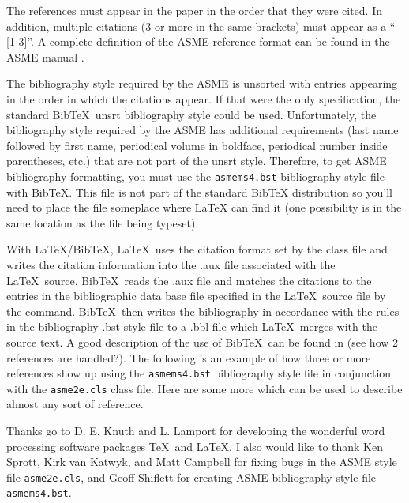 \documentclass[twocolumn,10pt]{asme2e}
\begin{document}
The references must appear in the paper in the order that
they were cited.  In addition, multiple citations (3 or
more in the same brackets) must appear as a `` [1-3]''.  A
complete definition of the ASME reference format can be
found in the  ASME manual \cite{asmemanual}.

The bibliography style required by the ASME is unsorted
with entries appearing in the order in which the citations
appear. If that were the only specification, the standard
{\sc Bib}\TeX\ unsrt bibliography style could be used.
Unfortunately, the bibliography style required by the ASME
has additional requirements (last name followed by first
name, periodical volume in boldface, periodical number
inside parentheses, etc.) that are not part of the unsrt
style. Therefore, to get ASME bibliography formatting, you
must use the \verb+asmems4.bst+ bibliography style file
with {\sc Bib}\TeX. This file is not part of the standard
BibTeX distribution so you'll need to place the file
someplace where LaTeX can find it (one possibility is in
the same location as the file being typeset).

With \LaTeX/{\sc Bib}\TeX, \LaTeX\ uses the citation format
set by the class file and writes the citation information
into the .aux file associated with the \LaTeX\ source. {\sc
Bib}\TeX\ reads the .aux file and matches the citations to
the entries in the bibliographic data base file specified
in the \LaTeX\ source file by the \verb++
command. {\sc Bib}\TeX\ then writes the bibliography in
accordance with the rules in the bibliography .bst style
file to a .bbl file which \LaTeX\ merges with the source
text.  A good description of the use of {\sc Bib}\TeX\ can
be found in \cite{latex, goosens} (see how 2 references are
handled?).  The following is an example of how three or
more references \cite{latex, asmemanual,  goosens} show up
using the \verb+asmems4.bst+ bibliography style file in
conjunction with the \verb+asme2e.cls+ class file. Here are
some more \cite{art, blt, ibk, icn, ips, mts, mis, pro,
pts, trt, upd} which can be used to describe almost any
sort of reference.




\begin{acknowledgment}
Thanks go to D. E. Knuth and L. Lamport for developing the
wonderful word processing software packages \TeX\ and
\LaTeX. I also would like to thank Ken Sprott, Kirk van
Katwyk, and Matt Campbell for fixing bugs in the ASME style
file \verb+asme2e.cls+, and Geoff Shiflett for creating
ASME bibliography style file \verb+asmems4.bst+.
\end{acknowledgment}
\end{document}

